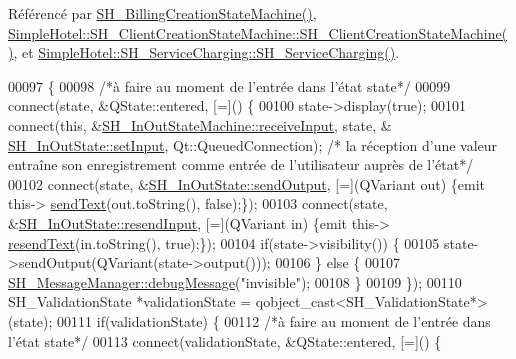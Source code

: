Référencé par \hyperlink{classSimpleHotel_1_1SH__BillingCreationStateMachine_a8c7d39e11d0ced1fd9c27a5550465b86}{S\-H\-\_\-\-Billing\-Creation\-State\-Machine()}, \hyperlink{classSimpleHotel_1_1SH__ClientCreationStateMachine_a301eb77d9ad72102d5fa8952980cf8a3}{Simple\-Hotel\-::\-S\-H\-\_\-\-Client\-Creation\-State\-Machine\-::\-S\-H\-\_\-\-Client\-Creation\-State\-Machine()}, et \hyperlink{classSimpleHotel_1_1SH__ServiceCharging_ae82c86c7e955f0dc93cdfc3603789b87}{Simple\-Hotel\-::\-S\-H\-\_\-\-Service\-Charging\-::\-S\-H\-\_\-\-Service\-Charging()}.


\begin{DoxyCode}
00097 \{
00098     \textcolor{comment}{/*à faire au moment de l'entrée dans l'état state*/}
00099     connect(state, &QState::entered, [=]() \{
00100         state->display(\textcolor{keyword}{true});
00101         connect(\textcolor{keyword}{this}, &\hyperlink{classSimpleHotel_1_1SH__InOutStateMachine_a17482446bbf0327e84feb5d6a1a612f0}{SH\_InOutStateMachine::receiveInput}, state, &
      \hyperlink{classSimpleHotel_1_1SH__InOutState_a30d45824ca3c749427ac8d40479cf072}{SH\_InOutState::setInput}, Qt::QueuedConnection); \textcolor{comment}{/* la réception d'une valeur
       entraîne son enregistrement comme entrée de l'utilisateur auprès de l'état*/}
00102         connect(state, &\hyperlink{classSimpleHotel_1_1SH__InOutState_a6f39ba3a9682ece4a0d2c96e8f8983a0}{SH\_InOutState::sendOutput}, [=](QVariant out) \{emit this->
      \hyperlink{classSimpleHotel_1_1SH__InOutStateMachine_ae81d4a51fcd3277ebfc11af978b74c0b}{sendText}(out.toString(), \textcolor{keyword}{false});\});
00103         connect(state, &\hyperlink{classSimpleHotel_1_1SH__InOutState_ab259648430e9e6e0667e79398c68c0d9}{SH\_InOutState::resendInput}, [=](QVariant in) \{emit this->
      \hyperlink{classSimpleHotel_1_1SH__InOutStateMachine_a5db6f59d446182ab9f10e0ccb0399915}{resendText}(in.toString(), \textcolor{keyword}{true});\});
00104         \textcolor{keywordflow}{if}(state->visibility()) \{
00105             state->sendOutput(QVariant(state->output()));
00106         \} \textcolor{keywordflow}{else} \{
00107             \hyperlink{classSimpleHotel_1_1SH__MessageManager_ad680f823897b7bf70e46ee18326c08b2}{SH\_MessageManager::debugMessage}(\textcolor{stringliteral}{"invisible"});
00108         \}
00109     \});
00110     SH\_ValidationState *validationState = qobject\_cast<SH\_ValidationState*>(state);
00111     \textcolor{keywordflow}{if}(validationState) \{
00112         \textcolor{comment}{/*à faire au moment de l'entrée dans l'état state*/}
00113         connect(validationState, &QState::entered, [=]() \{

\end{DoxyCode}
